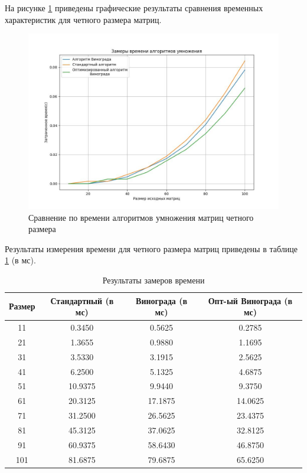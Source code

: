 На рисунке \ref{img:even} приведены графические результаты сравнения временных характеристик для четного размера матриц.

\begin{figure}[H]
	\begin{center}
		\includegraphics[scale=0.5]{img/even.jpeg}
	\end{center}
	\captionsetup{justification=centering}
	\caption{Сравнение по времени алгоритмов умножения матриц четного размера}
	\label{img:even}
\end{figure}

Результаты измерения времени для четного размера матриц приведены в таблице \ref{tbl:time_odd} (в мс).

\begin{table}[h]
    \begin{center}
        \begin{threeparttable}
        \captionsetup{justification=raggedright,singlelinecheck=off}
        \caption{Результаты замеров времени}
        \label{tbl:time_odd}
        \begin{tabular}{|c|c|c|c|}
            \hline
            Размер & Стандартный (в мс) & Винограда (в мс) & Опт-ый Винограда (в мс)  \\
            \hline
			   11 & 0.3450 & 0.5625 & 0.2785 \\ 
			\hline
			21 & 1.3655 & 0.9880 & 1.1695 \\ 
			\hline
			31 & 3.5330 & 3.1915 & 2.5625 \\ 
			\hline
			41 & 6.2500 & 5.1325 & 4.6875 \\ 
			\hline
			51 & 10.9375 & 9.9440 & 9.3750 \\ 
			\hline
			61 & 20.3125 & 17.1875 & 14.0625 \\ 
			\hline
			71 & 31.2500 & 26.5625 & 23.4375 \\ 
			\hline
			81 & 45.3125 & 37.0625 & 32.8125 \\ 
			\hline
			91 & 60.9375 & 58.6430 & 46.8750 \\ 
			\hline
			101 & 81.6875 & 79.6875 & 65.6250 \\ 
			\hline
		\end{tabular}
    \end{threeparttable}
\end{center}
\end{table}

